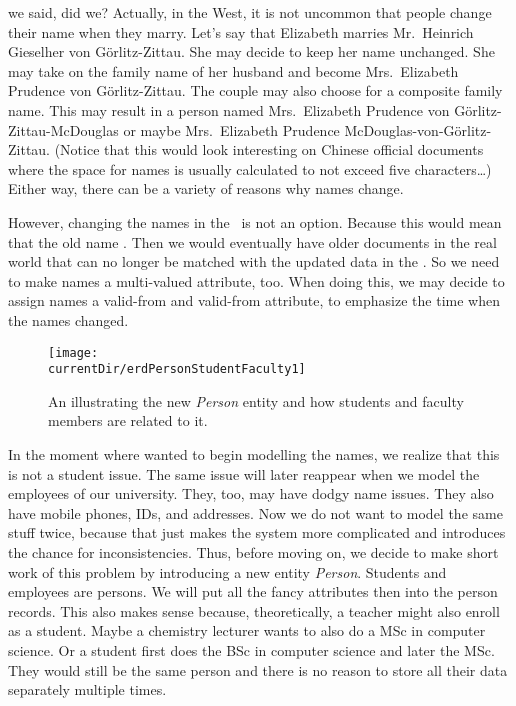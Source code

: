  we said, did we?
Actually, in the West, it is not uncommon that people change their name when they marry.
Let's say that Elizabeth marries Mr.~Heinrich Gieselher von G{\"o}rlitz-Zittau.
She may decide to keep her name unchanged.
She may take on the family name of her husband and become Mrs.~Elizabeth Prudence von G{\"o}rlitz-Zittau.
The couple may also choose for a composite family name.
This may result in a person named Mrs.~Elizabeth Prudence von G{\"o}rlitz-Zittau-McDouglas or maybe Mrs.~Elizabeth Prudence McDouglas-von-G{\"o}rlitz-Zittau.
(Notice that this would look interesting on Chinese official documents where the space for names is usually calculated to not exceed five characters\dots)
Either way, there can be a variety of reasons why names change.

However, changing the names in the \db\ is not an option.
Because this would mean that the old name .
Then we would eventually have older documents in the real world that can no longer be matched with the updated data in the \db.
So we need to make names a multi-valued attribute, too.
When doing this, we may decide to assign names a valid-from and valid-from attribute, to emphasize the time when the names changed.

\begin{figure}%
\centering%
\texttt{[image: \\currentDir/erdPersonStudentFaculty1]}%
\caption{An  illustrating the new \emph{Person} entity and how students and faculty members are related to it.}%
\label{fig:erdPersonStudentFaculty1}%
\end{figure}%

In the moment where wanted to begin modelling the names, we realize that this is not a student issue.
The same issue will later reappear when we model the employees of our university.
They, too, may have dodgy name issues.
They also have mobile phones, IDs, and addresses.
Now we do not want to model the same stuff twice, because that just makes the system more complicated and introduces the chance for inconsistencies.
Thus, before moving on, we decide to make short work of this problem by introducing a new entity \emph{Person}.
Students and employees are persons.
We will put all the fancy attributes then into the person records.
This also makes sense because, theoretically, a teacher might also enroll as a student.
Maybe a chemistry lecturer wants to also do a MSc in computer science.
Or a student first does the BSc in computer science and later the MSc.
They would still be the same person and there is no reason to store all their data separately multiple times.%

